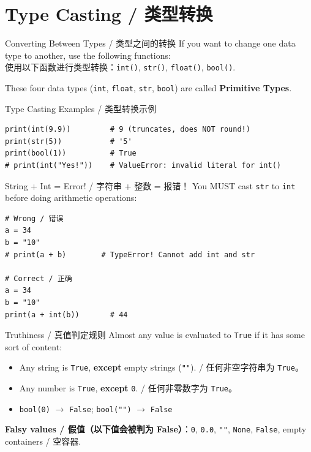 \documentclass[11pt,a4paper]{report}
\let\oldtexttt\texttt
\renewcommand{\texttt}[1]{\textcolor{mainblue}{\oldtexttt{#1}}}
\begin{document}
\section{Type Casting / 类型转换}

\begin{concept}{Converting Between Types / 类型之间的转换}
    If you want to change one data type to another, use the following functions: \\
    使用以下函数进行类型转换：\texttt{int()}, \texttt{str()}, \texttt{float()}, \texttt{bool()}.

    These four data types (\texttt{int}, \texttt{float}, \texttt{str}, \texttt{bool}) are called \textbf{Primitive Types}.
\end{concept}

\begin{examplebox}{Type Casting Examples / 类型转换示例}
\begin{lstlisting}
print(int(9.9))         # 9 (truncates, does NOT round!)
print(str(5))           # '5'
print(bool(1))          # True
# print(int("Yes!"))    # ValueError: invalid literal for int()
\end{lstlisting}
\end{examplebox}

\begin{warning}{String + Int = Error! / 字符串 + 整数 = 报错！}
    You MUST cast \texttt{str} to \texttt{int} before doing arithmetic operations:
\begin{lstlisting}
# Wrong / 错误
a = 34
b = "10"
# print(a + b)        # TypeError! Cannot add int and str

# Correct / 正确
a = 34
b = "10"
print(a + int(b))       # 44
\end{lstlisting}
\end{warning}

\begin{concept}{Truthiness / 真值判定规则}
    Almost any value is evaluated to \texttt{True} if it has some sort of content:
    \begin{itemize}[itemsep=0.3em]
        \item Any string is \texttt{True}, \textbf{except} empty strings (\texttt{""}). / 任何非空字符串为 \texttt{True}。
        \item Any number is \texttt{True}, \textbf{except} \texttt{0}. / 任何非零数字为 \texttt{True}。
        \item \texttt{bool(0)} $\rightarrow$ \texttt{False}; \texttt{bool("")} $\rightarrow$ \texttt{False}
    \end{itemize}
    \textbf{Falsy values / 假值（以下值会被判为 False）}：\texttt{0}, \texttt{0.0}, \texttt{""}, \texttt{None}, \texttt{False}, empty containers / 空容器.
\end{concept}
\end{document}
